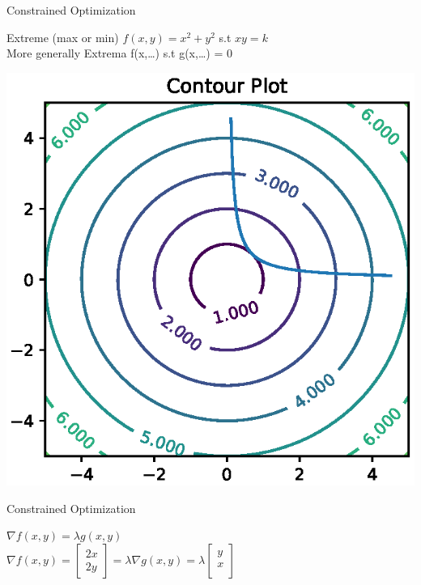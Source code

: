 \documentclass{beamer}
\begin{document}
\begin{frame}{Constrained Optimization}

Extreme (max or min) $f(x,y) = x^{2}+y^{2}$ s.t $xy=k$\\

\vspace{2em}
More generally Extrema f(x,\dots) s.t g(x,\dots) = 0
\begin{center}
	\includegraphics[totalheight=6cm]{ml-maths/contour-plot-6.eps}
\end{center}



\end{frame}

\begin{frame}{Constrained Optimization}

$\nabla f(x,y) = \lambda g(x,y)$\\
$\nabla f(x,y) = \begin{bmatrix}
2x\\
2y
\end{bmatrix}
= \lambda \nabla g(x,y)  = \lambda \begin{bmatrix}
y\\
x\\
\end{bmatrix}$
\end{frame}
\end{document}

